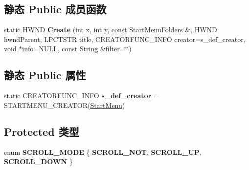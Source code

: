 \subsection*{静态 Public 成员函数}
\begin{DoxyCompactItemize}
\item 
\mbox{\label{struct_start_menu_a676d8cc1fc756c2ad32b62168d3d5a92}} 
static \hyperlink{interfacevoid}{H\+W\+ND} {\bfseries Create} (int x, int y, const \hyperlink{classlist}{Start\+Menu\+Folders} \&, \hyperlink{interfacevoid}{H\+W\+ND} hwnd\+Parent, L\+P\+C\+T\+S\+TR title, C\+R\+E\+A\+T\+O\+R\+F\+U\+N\+C\+\_\+\+I\+N\+FO creator=s\+\_\+def\+\_\+creator, \hyperlink{interfacevoid}{void} $\ast$info=N\+U\+LL, const String \&filter=\char`\"{}\char`\"{})
\end{DoxyCompactItemize}
\subsection*{静态 Public 属性}
\begin{DoxyCompactItemize}
\item 
\mbox{\label{struct_start_menu_af2e07c4a05740c7272836e3b1cff5ead}} 
static C\+R\+E\+A\+T\+O\+R\+F\+U\+N\+C\+\_\+\+I\+N\+FO {\bfseries s\+\_\+def\+\_\+creator} = S\+T\+A\+R\+T\+M\+E\+N\+U\+\_\+\+C\+R\+E\+A\+T\+OR(\hyperlink{struct_start_menu}{Start\+Menu})
\end{DoxyCompactItemize}
\subsection*{Protected 类型}
\begin{DoxyCompactItemize}
\item 
\mbox{\label{struct_start_menu_a4eb846b54fe1a55fc1ac205194d49c73}} 
enum {\bfseries S\+C\+R\+O\+L\+L\+\_\+\+M\+O\+DE} \{ {\bfseries S\+C\+R\+O\+L\+L\+\_\+\+N\+OT}, 
{\bfseries S\+C\+R\+O\+L\+L\+\_\+\+UP}, 
{\bfseries S\+C\+R\+O\+L\+L\+\_\+\+D\+O\+WN}
 \}
\end{DoxyCompactItemize}
